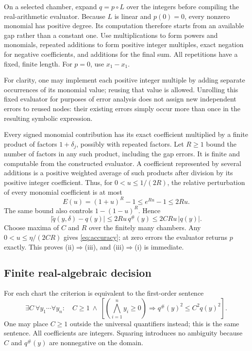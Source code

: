 \documentclass[11pt,a4paper]{article}
\theoremstyle{definition}
\theoremstyle{remark}
\newcommand{\abs}[1]{\lvert #1\rvert}
\newcommand{\maj}[1]{#1^{\#}}
\begin{document}
On a selected chamber, expand $q=p\circ L$ over the integers before compiling
the real-arithmetic evaluator. Because $L$ is linear and $p(0)=0$, every nonzero
monomial has positive degree. Its computation therefore starts from an
available gap rather than a constant one. Use multiplications to form powers
and monomials, repeated additions to form positive integer multiples, exact
negation for negative coefficients, and additions for the final sum. All
repetitions have a fixed, finite length. For $p=0$, use $x_1-x_1$.

For clarity, one may implement each positive integer multiple by adding
separate occurrences of its monomial value; reusing that value is allowed.
Unrolling this fixed evaluator for purposes of error analysis does not assign
new independent errors to reused nodes: their existing errors simply occur
more than once in the resulting symbolic expression.

Every signed monomial contribution has its exact coefficient multiplied by a
finite product of factors $1+\delta_j$, possibly with repeated factors. Let
$R\ge1$ bound the number of factors in any such product, including the gap
errors. It is finite and computable from the constructed evaluator. A
coefficient represented by several additions is a positive weighted average
of such products after division by its positive integer coefficient. Thus,
for $0<u\le1/(2R)$, the relative perturbation of every monomial coefficient is
at most
\begin{equation}\label{eq:errorbound}
 E(u)=(1+u)^R-1\le e^{Ru}-1\le2Ru.
\end{equation}
The same bound also controls $1-(1-u)^R$. Hence
\begin{equation}\label{eq:forward}
 \abs{\widetilde q(y,\delta)-q(y)}
 \le 2Ru\,\maj q(y)
 \le 2CRu\,\abs{q(y)}.
\end{equation}
Choose maxima of $C$ and $R$ over the finitely many chambers. Any
$0<u\le\eta/(2CR)$ gives \eqref{eq:accuracy}; at zero errors the evaluator
returns $p$ exactly. This proves (ii)$\Rightarrow$(iii), and
(iii)$\Rightarrow$(i) is immediate.

\subsection{Finite real-algebraic decision}

For each chart the criterion is equivalent to the first-order sentence
\begin{equation}\label{eq:QE}
 \exists C\ \forall y_1\cdots\forall y_n:\quad
 C\ge1\ \wedge\
 \left[\left(\bigwedge_{i=1}^{n}y_i\ge0\right)
 \Longrightarrow \maj q(y)^2\le C^2q(y)^2\right].
\end{equation}
One may place $C\ge1$ outside the universal quantifiers instead; this is the
same sentence. All coefficients are integers. Squaring introduces no ambiguity
because $C$ and $\maj q(y)$ are nonnegative on the domain.
\end{document}
